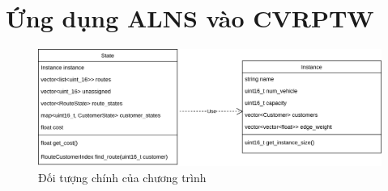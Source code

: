 \chapter{Ứng dụng ALNS vào CVRPTW}

\begin{figure}[H] %
  \centering %
  \includegraphics[width=1\textwidth]{figures/core-object.png} 
  \caption{Đối tượng chính của chương trình} 
  \label{fig:fg_02}
\end{figure}